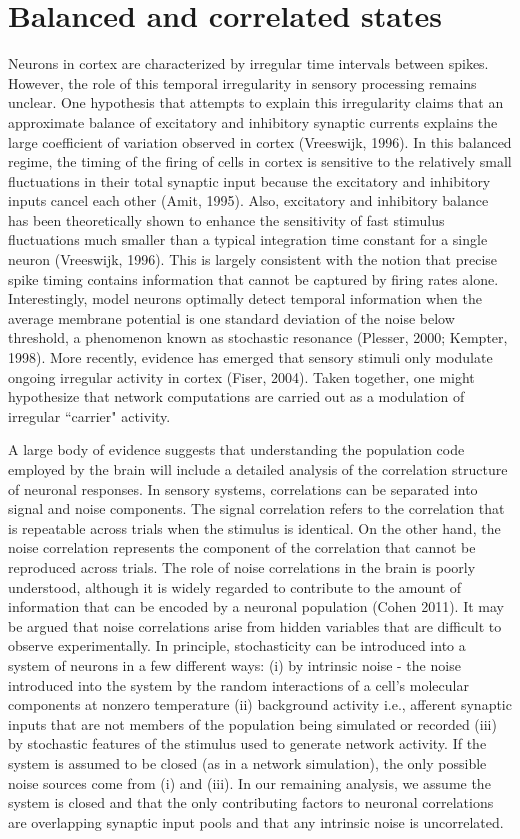 \documentclass{ucetd}
\begin{document}
\section{Balanced and correlated states}

Neurons in cortex are characterized by irregular time intervals between spikes. However, the role of this temporal irregularity in sensory processing remains unclear. One hypothesis that attempts to explain this irregularity claims that an approximate balance of excitatory and inhibitory synaptic currents explains the large coefficient of variation observed in cortex (Vreeswijk, 1996). In this balanced regime, the timing of the firing of cells in cortex is sensitive to the relatively small fluctuations in their total synaptic input because the excitatory and inhibitory inputs cancel each other (Amit, 1995). Also, excitatory and inhibitory balance has been theoretically shown to enhance the sensitivity of fast stimulus fluctuations much smaller than a typical integration time constant for a single neuron (Vreeswijk, 1996). This is largely consistent with the notion that precise spike timing contains information that cannot be captured by firing rates alone. Interestingly, model neurons optimally detect temporal information when the average membrane potential is one standard deviation of the noise below threshold, a phenomenon known as stochastic resonance (Plesser, 2000; Kempter, 1998). More recently, evidence has emerged that sensory stimuli only modulate ongoing irregular activity in cortex (Fiser, 2004). Taken together, one might hypothesize that network computations are carried out as a modulation of irregular ``carrier" activity. 


A large body of evidence suggests that understanding the population code employed by the brain will include a detailed analysis of the correlation structure of neuronal responses. In sensory systems, correlations can be separated into signal and noise components. The signal correlation refers to the correlation that is repeatable across trials when the stimulus is identical. On the other hand, the noise correlation represents the component of the correlation that cannot be reproduced across trials. The role of noise correlations in the brain is poorly understood, although it is widely regarded to contribute to the amount of information that can be encoded by a neuronal population (Cohen 2011). It may be argued that noise correlations arise from hidden variables that are difficult to observe experimentally. In principle, stochasticity can be introduced into a system of neurons in a few different ways: (i) by intrinsic noise - the noise introduced into the system by the random interactions of a cell's molecular components at nonzero temperature (ii) background activity i.e., afferent synaptic inputs that are not members of the population being simulated or recorded (iii) by stochastic features of the stimulus used to generate network activity. If the system is assumed to be closed (as in a network simulation), the only possible noise sources come from (i) and (iii). In our remaining analysis, we assume the system is closed and that the only contributing factors to neuronal correlations are overlapping synaptic input pools and that any intrinsic noise is uncorrelated.
\end{document}

